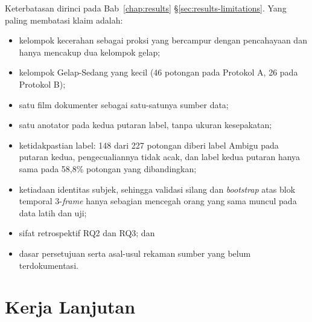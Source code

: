 Keterbatasan dirinci pada Bab~\ref{chap:results} \S\ref{sec:results-limitations}. Yang paling membatasi klaim adalah:
\begin{itemize}
  \item kelompok kecerahan sebagai proksi yang bercampur dengan pencahayaan dan hanya mencakup dua kelompok gelap;
  \item kelompok Gelap-Sedang yang kecil (46 potongan pada Protokol A, 26 pada Protokol B);
  \item satu film dokumenter sebagai satu-satunya sumber data;
  \item satu anotator pada kedua putaran label, tanpa ukuran kesepakatan;
  \item ketidakpastian label: 148 dari 227 potongan diberi label Ambigu pada putaran kedua, pengecualiannya tidak acak, dan label kedua putaran hanya sama pada 58,8\% potongan yang dibandingkan;
  \item ketiadaan identitas subjek, sehingga validasi silang dan \textit{bootstrap} atas blok temporal 3-\textit{frame} hanya sebagian mencegah orang yang sama muncul pada data latih dan uji;
  \item sifat retrospektif RQ2 dan RQ3; dan
  \item dasar persetujuan serta asal-usul rekaman sumber yang belum terdokumentasi.
\end{itemize}

\section{Kerja Lanjutan}
\label{sec:future-work}

